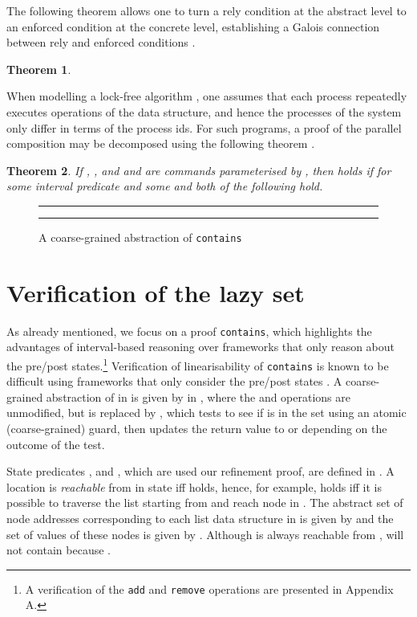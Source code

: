 \documentclass{article}
\def\figrule{\rule{\columnwidth}{0.5pt}}
\theoremstyle{plain}
\newcounter{thm}
\newtheorem{theorem}{Theorem}[section]
\theoremstyle{definition}
\begin{document}
The following theorem allows one to turn a rely condition at the
abstract level to an enforced condition at the concrete level,
establishing a Galois connection between rely and enforced conditions
\cite{DDH12}.
\begin{theorem}
  \label{thm:rely-enf-gc}
  
\end{theorem}
When modelling a lock-free algorithm \cite{CGLM06,DSW11,VHHS06}, one
assumes that each process repeatedly executes operations of the data
structure, and hence the processes of the system only differ in terms
of the process ids. For such programs, a proof of the parallel
composition may be decomposed using the following theorem \cite{DD12}.
\begin{theorem}
  \label{thm:decompose}
  If , , and
   and  are commands parameterised by , then  holds if
  for some interval predicate  and some  and  both of the following hold.
  
\end{theorem}

\begin{figure}[!t]
  \centering
  \figrule\small

    
    \smallskip
  
    
    \figrule
  \caption{A coarse-grained abstraction of {\tt contains}}
  \label{fig:labs}
\end{figure}


\section{Verification of the lazy set}
\label{sec:verif-lazy-set}


As already mentioned, we focus on a proof {\tt contains}, which
highlights the advantages of interval-based reasoning over frameworks
that only reason about the pre/post states.\footnote{A verification of
  the {\tt add} and {\tt remove} operations are presented in Appendix
  A.}  Verification of linearisability of \texttt{contains} is known
to be difficult using frameworks that only consider the pre/post
states \cite{Vaf10,VHHS06,CGLM06,DSW11}. A coarse-grained abstraction
of  in  is given by
 in , where the  and
 operations are unmodified, but 
is replaced by , which tests to see if  is in the
set using an atomic (coarse-grained) guard, then updates the return
value to  or  depending on the outcome of the test.

State predicates ,  and , which are used
our refinement proof, are defined in . A location
 is \emph{reachable} from  in state  iff
 holds, hence, for example,
 holds iff it is possible to traverse the
list starting from  and reach node  in . The abstract
set of node addresses corresponding to each list data structure in
 is given by  and the set of values of these nodes is
given by . Although  is always reachable from
,  will not contain  because .
\end{document}
